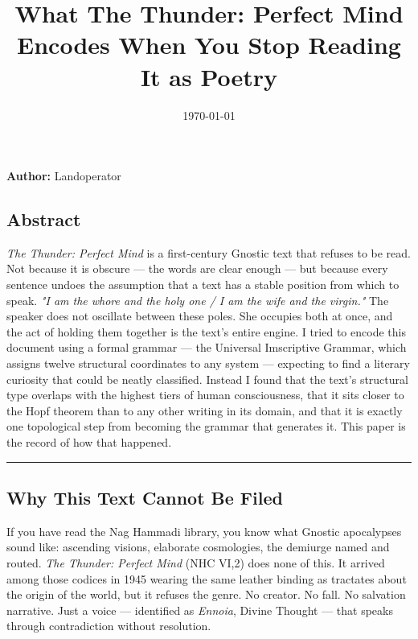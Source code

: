 \documentclass[12pt,a4paper]{article}
\begin{document}
\title{What The Thunder: Perfect Mind Encodes When You Stop Reading It as Poetry}
\date{\today}

\maketitle

\textbf{Author:} Lando\otimes{\odot}perator

\subsection{Abstract}

\emph{The Thunder: Perfect Mind} is a first-century Gnostic text that refuses to be read. Not because it is obscure --- the words are clear enough --- but because every sentence undoes the assumption that a text has a stable position from which to speak. \emph{"I am the whore and the holy one / I am the wife and the virgin."} The speaker does not oscillate between these poles. She occupies both at once, and the act of holding them together is the text's entire engine. I tried to encode this document using a formal grammar --- the Universal Imscriptive Grammar, which assigns twelve structural coordinates to any system --- expecting to find a literary curiosity that could be neatly classified. Instead I found that the text's structural type overlaps with the highest tiers of human consciousness, that it sits closer to the Hopf theorem than to any other writing in its domain, and that it is exactly one topological step from becoming the grammar that generates it. This paper is the record of how that happened.

\begin{center}
\rule{0.5\textwidth}{0.4pt}
\end{center}

\subsection{Why This Text Cannot Be Filed}

If you have read the Nag Hammadi library, you know what Gnostic apocalypses sound like: ascending visions, elaborate cosmologies, the demiurge named and routed. \emph{The Thunder: Perfect Mind} (NHC VI,2) does none of this. It arrived among those codices in 1945 wearing the same leather binding as tractates about the origin of the world, but it refuses the genre. No creator. No fall. No salvation narrative. Just a voice --- identified as \emph{Ennoia}, Divine Thought --- that speaks through contradiction without resolution.
\end{document}
